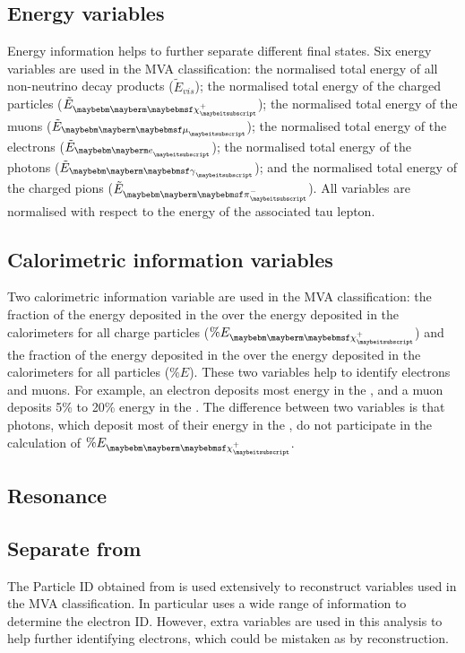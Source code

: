 \subsection{Energy variables}

Energy information helps to further separate different final states. Six energy variables are used in the MVA classification: the normalised total energy of all non-neutrino decay products ($\tilde{E}_{vis}$); the normalised total energy of the charged particles ($\tilde{E}_{\charge}$); the normalised total energy of the muons ($\tilde{E}_{\Pmu}$); the normalised total energy of the electrons ($\tilde{E}_{\Pe}$); the normalised total energy of the photons ($\tilde{E}_{\Pgg}$); and the normalised total energy of the charged pions ($\tilde{E}_{\Pgpm}$). All variables are normalised with respect to the energy of the associated tau lepton.

\subsection{Calorimetric information variables}


Two calorimetric information variable are used in the MVA classification: the fraction of the energy  deposited in the \ECAL over the  energy deposited in the calorimeters for all charge particles ($\% E_{\charge}$) and the fraction of the energy  deposited in the \ECAL over the  energy deposited in the calorimeters for all particles ($\% E$). These  two variables help to identify electrons and muons. For example, an electron deposits most energy in the \ECAL, and a muon deposits 5\% to 20\% energy in the \ECAL. The difference between two variables is that photons, which deposit most of their energy in the \ECAL, do not participate in the calculation of $\% E_{\charge}$.

\subsection{Resonance}

\subsection{Separate \decayElectronShort from \decayPionShort}

The Particle ID obtained from \pandora is used extensively to reconstruct variables used in the MVA classification. In particular \pandora uses a wide range of information to determine the electron ID. However, extra variables are used in this analysis to help further identifying electrons, which could be mistaken as \Pgpm by \pandora reconstruction.

